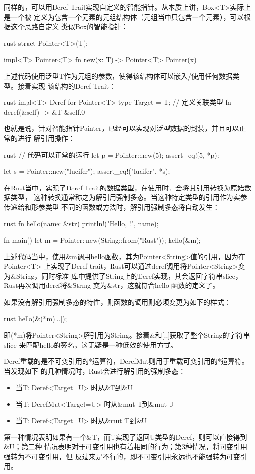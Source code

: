 同样的，可以用Deref Trait实现自定义的智能指针。从本质上讲，Box<T>实际上是一个被
定义为包含一个元素的元组结构体（元组当中只包含一个元素），可以根据这个思路自定义
类似Box的智能指针：
\begin{code-block}{rust}
struct Pointer<T>(T);

impl<T> Pointer<T> {
    fn new(x: T) -> Pointer<T> {
        Pointer(x)
    }
}
\end{code-block}
上述代码使用泛型T作为元组的参数，使得该结构体可以嵌入/使用任何数据类型。接着实现
该结构的Deref Trait：
\begin{code-block}{rust}
impl<T> Deref for Pointer<T> {
    type Target = T; // 定义关联类型
    fn deref(&self) -> &T {
        &self.0
    }
}
\end{code-block}
也就是说，针对智能指针Pointer，已经可以实现对泛型数据的封装，并且可以正常的进行
解引用操作：
\begin{code-block}{rust}
// 代码可以正常的运行
let p = Pointer::new(5);
assert_eq!(5, *p);

let s = Pointer::new("lucifer");
assert_eq!("lucifer", *s);
\end{code-block}

在Rust当中，实现了Deref Trait的数据类型，在使用时，会将其引用转换为原始数据类型，
这种转换通常称之为解引用强制多态。当这种特定类型的引用作为实参传递给和形参类型
不同的函数或方法时，解引用强制多态将自动发生：
\begin{code-block}{rust}
fn hello(name: &str) {
    println!("Hello, {}!", name);
}

fn main() {
    let m = Pointer::new(String::from("Rust"));
    hello(&m);
}
\end{code-block}
上述代码当中，使用\&m调用hello函数，其为Pointer<String>值的引用，因为在Pointer<T>
上实现了Deref trait，Rust可以通过deref调用将Pointer<String>变为\&String，同时标准
库中提供了String上的Deref实现，其会返回字符串slice，Rust再次调用deref将\&String
变为\&str，这就符合hello 函数的定义了。

如果没有解引用强制多态的特性，则函数的调用则必须变更为如下的样式：
\begin{code-block}{rust}
hello(&(*m)[..]);
\end{code-block}
即(*m)将Pointer<String>解引用为String。接着\&和[..]获取了整个String的字符串slice
来匹配hello的签名，这无疑是一种低效的使用方式。

Deref重载的是不可变引用的*运算符，DerefMut则用于重载可变引用的*运算符。当发现如下
的几种情况时，Rust会进行解引用的强制多态：
\begin{itemize}
  \item 当T: Deref<Target=U> 时从\&T到\&U
  \item 当T: DerefMut<Target=U> 时从\&mut T到\&mut U
  \item 当T: Deref<Target=U> 时从\&mut T到\&U
\end{itemize}
第一种情况表明如果有一个\&T，而T实现了返回U类型的Deref，则可以直接得到\&U；第二种
情况表明对于可变引用也有着相同的行为；第3种情况，将可变引用强转为不可变引用，但
反过来是不行的，即不可变引用永远也不能强转为可变引用。


